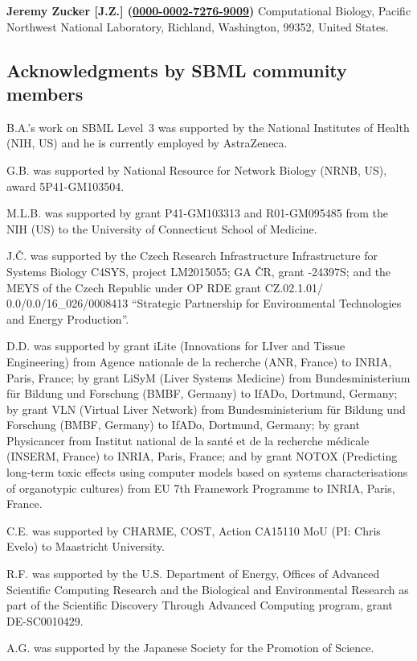 \documentclass{sbml-paper}
\newcommand{\orcid}[1]{\href{https://orcid.org/#1}{#1}}
\begin{document}
\textbf{Jeremy Zucker [J.Z.] (\orcid{0000-0002-7276-9009})} Computational Biology, Pacific Northwest National Laboratory, Richland, Washington, 99352, United States.


\clearpage
\subsection{Acknowledgments by SBML community members}

B.A.'s work on SBML Level~3 was supported by the National Institutes of Health (NIH, US) and he is currently employed by AstraZeneca.

G.B. was supported by National Resource for Network Biology (NRNB, US), award \No 5P41-GM103504.

M.L.B. was supported by grant \No P41-GM103313 and R01-GM095485 from the NIH (US) to the University of Connecticut School of Medicine.

J.\v{C}. was supported by the Czech Research Infrastructure Infrastructure for Systems Biology C4SYS, project \No LM2015055; GA \v{C}R, grant -24397S; and the MEYS of the Czech Republic under OP RDE grant \No CZ.02.1.01/ 0.0/0.0/16\_026/0008413 ``Strategic Partnership for Environmental Technologies and Energy Production''.

D.D. was supported by grant iLite (Innovations for LIver and Tissue Engineering) from Agence nationale de la recherche (ANR, France) to INRIA, Paris, France; by grant LiSyM (Liver Systems Medicine) from Bundesministerium f\"{u}r Bildung und Forschung (BMBF, Germany) to IfADo, Dortmund, Germany; by grant VLN (Virtual Liver Network) from Bundesministerium f\"{u}r Bildung und Forschung (BMBF, Germany) to IfADo, Dortmund, Germany; by grant Physicancer from Institut national de la sant\'{e} et de la recherche m\'{e}dicale (INSERM, France) to INRIA, Paris, France; and by grant NOTOX (Predicting long-term toxic effects using computer models based on systems characterisations of organotypic cultures) from EU 7th Framework Programme to INRIA, Paris, France.

C.E. was supported by CHARME, COST, Action CA15110 MoU (PI: Chris Evelo) to Maastricht University.

R.F. was supported by the U.S. Department of Energy, Offices of Advanced Scientific Computing Research and the Biological and Environmental Research as part of the Scientific Discovery Through Advanced Computing program, grant \No DE-SC0010429.

A.G. was supported by the Japanese Society for the Promotion of Science.
\end{document}
